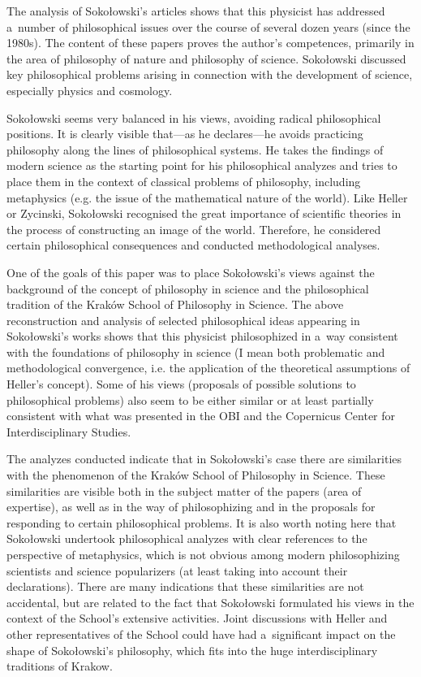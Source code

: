 The analysis of Sokołowski's articles shows that this physicist has addressed a~number of philosophical issues over the course of several dozen years (since the 1980s). The content of these papers proves the author's competences, primarily in the area of philosophy of nature and philosophy of science. Sokołowski discussed key philosophical problems arising in connection with the development of science, especially physics and cosmology.



Sokołowski seems very balanced in his views, avoiding radical philosophical positions. It is clearly visible that---as he declares---he avoids practicing philosophy along the lines of philosophical systems. He takes the findings of modern science as the starting point for his philosophical analyzes and tries to place them in the context of classical problems of philosophy, including metaphysics (e.g. the issue of the mathematical nature of the world). Like Heller or Zycinski, Sokołowski recognised the great importance of scientific theories in the process of constructing an image of the world. Therefore, he considered certain philosophical consequences and conducted methodological analyses.



One of the goals of this paper was to place Sokołowski's views against the background of the concept of philosophy in science and the philosophical tradition of the Kraków School of Philosophy in Science. The above reconstruction and analysis of selected philosophical ideas appearing in Sokołowski's works shows that this physicist philosophized in a~way consistent with the foundations of philosophy in science (I mean both problematic and methodological convergence, i.e. the application of the theoretical assumptions of Heller's concept). Some of his views (proposals of possible solutions to philosophical problems) also seem to be either similar or at least partially consistent with what was presented in the OBI and the Copernicus Center for Interdisciplinary Studies.



The analyzes conducted indicate that in Sokołowski's case there are similarities with the phenomenon of the Kraków School of Philosophy in Science. These similarities are visible both in the subject matter of the papers (area of expertise), as well as in the way of philosophizing and in the proposals for responding to certain philosophical problems. It is also worth noting here that Sokołowski undertook philosophical analyzes with clear references to the perspective of metaphysics, which is not obvious among modern philosophizing scientists and science popularizers (at least taking into account their declarations). There are many indications that these similarities are not accidental, but are related to the fact that Sokołowski formulated his views in the context of the School's extensive activities. Joint discussions with Heller and other representatives of the School could have had a~significant impact on the shape of Sokołowski's philosophy, which fits into the huge interdisciplinary traditions of Krakow.



